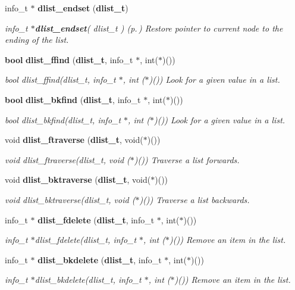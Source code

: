 \begin{CompactItemize}
info\_\-t $\ast$ {\bf dlist\_\-endset} ({\bf dlist\_\-t})
\begin{CompactList}\small\item\em info\_\-t $\ast${\bf dlist\_\-endset}( dlist\_\-t ) {\rm (p.\,\pageref{P__dlist_8h_a16})} Restore pointer to current node to the ending of the list.\item\end{CompactList}\item 
{\bf bool} {\bf dlist\_\-ffind} ({\bf dlist\_\-t}, info\_\-t $\ast$, int($\ast$)())
\begin{CompactList}\small\item\em bool dlist\_\-ffind(dlist\_\-t, info\_\-t $\ast$, int ($\ast$)()) Look for a given value in a list.\item\end{CompactList}\item 
{\bf bool} {\bf dlist\_\-bkfind} ({\bf dlist\_\-t}, info\_\-t $\ast$, int($\ast$)())
\begin{CompactList}\small\item\em bool dlist\_\-bkfind(dlist\_\-t, info\_\-t $\ast$, int ($\ast$)()) Look for a given value in a list.\item\end{CompactList}\item 
void {\bf dlist\_\-ftraverse} ({\bf dlist\_\-t}, void($\ast$)())
\begin{CompactList}\small\item\em void dlist\_\-ftraverse(dlist\_\-t, void ($\ast$)()) Traverse a list forwards.\item\end{CompactList}\item 
void {\bf dlist\_\-bktraverse} ({\bf dlist\_\-t}, void($\ast$)())
\begin{CompactList}\small\item\em void dlist\_\-bktraverse(dlist\_\-t, void ($\ast$)()) Traverse a list backwards.\item\end{CompactList}\item 
info\_\-t $\ast$ {\bf dlist\_\-fdelete} ({\bf dlist\_\-t}, info\_\-t $\ast$, int($\ast$)())
\begin{CompactList}\small\item\em info\_\-t $\ast$dlist\_\-fdelete(dlist\_\-t, info\_\-t $\ast$, int ($\ast$)()) Remove an item in the list.\item\end{CompactList}\item 
info\_\-t $\ast$ {\bf dlist\_\-bkdelete} ({\bf dlist\_\-t}, info\_\-t $\ast$, int($\ast$)())
\begin{CompactList}\small\item\em info\_\-t $\ast$dlist\_\-bkdelete(dlist\_\-t, info\_\-t $\ast$, int ($\ast$)()) Remove an item in the list.\item\end{CompactList}\end{CompactItemize}


